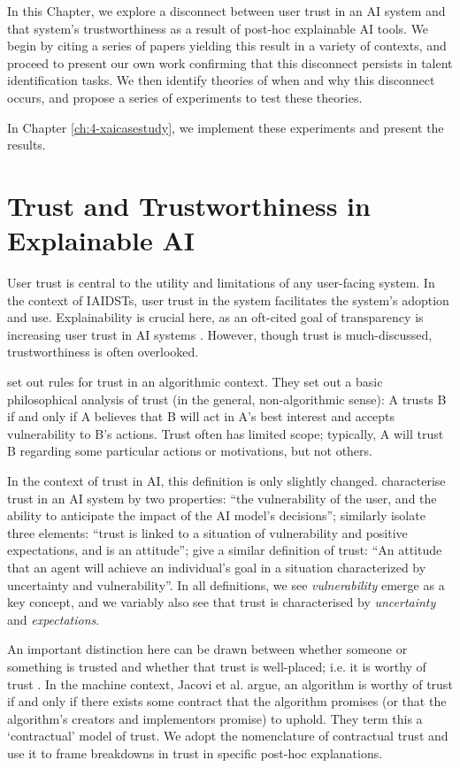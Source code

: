 In this Chapter, we explore a disconnect between user trust in an AI system and that system's trustworthiness as a result of post-hoc explainable AI tools. We begin by citing a series of papers yielding this result in a variety of contexts, and proceed to present our own work confirming that this disconnect persists in talent identification tasks. We then identify theories of when and why this disconnect occurs, and propose a series of experiments to test these theories. 

In Chapter \ref{ch:4-xaicasestudy}, we implement these experiments and present the results.

\section{Trust and Trustworthiness in Explainable AI}
User trust is central to the utility and limitations of any user-facing system. In the context of IAIDSTs, user trust in the system facilitates the system's adoption and use. Explainability is crucial here, as an oft-cited goal of transparency is increasing user trust in AI systems \cite{wang_transparency_2022}. However, though trust is much-discussed, trustworthiness is often overlooked.

\textcite{jacovi_formalizing_2021} set out rules for trust in an algorithmic context. They set out a basic philosophical analysis of trust (in the general, non-algorithmic sense): A trusts B if and only if A believes that B will act in A's best interest and accepts vulnerability to B's actions. Trust often has limited scope; typically, A will trust B regarding some particular actions or motivations, but not others.

In the context of trust in AI, this definition is only slightly changed. \textcite{jacovi_formalizing_2021} characterise trust in an AI system by two properties: ``the vulnerability of the user, and the ability to anticipate the impact of the AI model's decisions''; \textcite{vereschak_how_2021} similarly isolate three elements: ``trust is linked to a situation of vulnerability and positive expectations, and is an attitude''; \textcite{lee_trust_2004} give a similar definition of trust: ``An attitude that an agent will achieve an individual's goal in a situation characterized by uncertainty and vulnerability''. In all definitions, we see \emph{vulnerability} emerge as a key concept, and we variably also see that trust is characterised by \emph{uncertainty} and \emph{expectations}.

An important distinction here can be drawn between whether someone or something is trusted and whether that trust is well-placed; i.e. it is worthy of trust \cite{hardin_trust_2002}. In the machine context, Jacovi et al. argue, an algorithm is worthy of trust if and only if there exists some contract that the algorithm promises (or that the algorithm's creators and implementors promise) to uphold. They term this a `contractual' model of trust. We adopt the nomenclature of contractual trust and use it to frame breakdowns in trust in specific post-hoc explanations.

